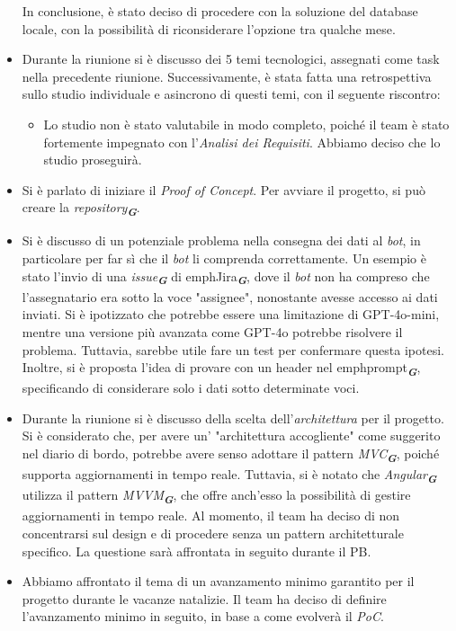 \begin{itemize}
\begin{itemize}
    \end{itemize}
    In conclusione, è stato deciso di procedere con la soluzione del database locale, con la possibilità di riconsiderare l'opzione tra qualche mese.
    \item Durante la riunione si è discusso dei 5 temi tecnologici, assegnati come task nella precedente riunione.  
    Successivamente, è stata fatta una retrospettiva sullo studio individuale e asincrono di questi temi, con il seguente riscontro:
    \begin{itemize}
    \item Lo studio non è stato valutabile in modo completo, poiché il team è stato fortemente impegnato con l'\emph{Analisi dei Requisiti}. Abbiamo deciso che lo studio proseguirà.
    \end{itemize} 
    \item Si è parlato di iniziare il \emph{Proof of Concept}. Per avviare il progetto, si può creare la \emph{repository}\textsubscript{\textit{\textbf{G}}}.  
    \item Si è discusso di un potenziale problema nella consegna dei dati al \emph{bot}, in particolare per far sì che il \emph{bot} li comprenda correttamente. Un esempio è stato l'invio di una \emph{issue}\textsubscript{\textit{\textbf{G}}} di emph{Jira}\textsubscript{\textit{\textbf{G}}}, dove il \emph{bot} non ha compreso che l'assegnatario era sotto la voce "assignee", nonostante avesse accesso ai dati inviati. Si è ipotizzato che potrebbe essere una limitazione di GPT-4o-mini, mentre una versione più avanzata come GPT-4o potrebbe risolvere il problema. 
    Tuttavia, sarebbe utile fare un test per confermare questa ipotesi.  
    Inoltre, si è proposta l'idea di provare con un header nel emph{prompt}\textsubscript{\textit{\textbf{G}}}, specificando di considerare solo i dati sotto determinate voci.
    \item Durante la riunione si è discusso della scelta dell'\emph{architettura} per il progetto. Si è considerato che, per avere un' "architettura accogliente" come suggerito nel diario di bordo, potrebbe avere senso adottare il pattern \emph{MVC}\textsubscript{\textit{\textbf{G}}}, poiché supporta aggiornamenti in tempo reale.  
    Tuttavia, si è notato che \emph{Angular}\textsubscript{\textit{\textbf{G}}} utilizza il pattern \emph{MVVM}\textsubscript{\textit{\textbf{G}}}, che offre anch'esso la possibilità di gestire aggiornamenti in tempo reale.  
    Al momento, il team ha deciso di non concentrarsi sul design e di procedere senza un pattern architetturale specifico. La questione sarà affrontata in seguito durante il PB.
    \item Abbiamo affrontato il tema di un avanzamento minimo garantito per il progetto durante le vacanze natalizie.
    Il team ha deciso di definire l'avanzamento minimo in seguito, in base a come evolverà il \emph{PoC}. 
    
    
    
\end{itemize}
